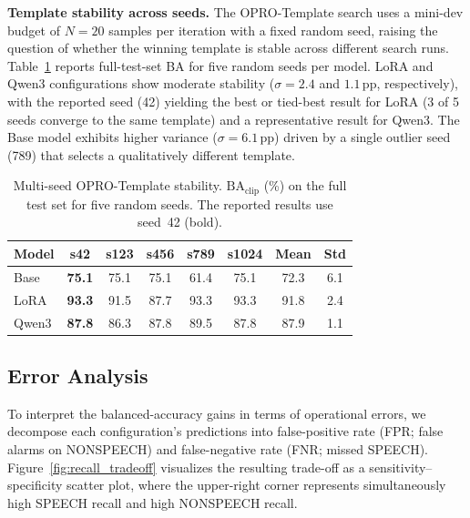 \documentclass[11pt,a4paper]{article}
\begin{document}
\textbf{Template stability across seeds.}
The OPRO-Template search uses a mini-dev budget of $N = 20$ samples per iteration with a fixed random seed, raising the question of whether the winning template is stable across different search runs. Table~\ref{tab:multiseed_opro} reports full-test-set BA for five random seeds per model. LoRA and Qwen3 configurations show moderate stability ($\sigma = 2.4$ and $1.1$\,pp, respectively), with the reported seed (42) yielding the best or tied-best result for LoRA (3 of 5 seeds converge to the same template) and a representative result for Qwen3. The Base model exhibits higher variance ($\sigma = 6.1$\,pp) driven by a single outlier seed (789) that selects a qualitatively different template.

\begin{table}[t]
\centering
\caption{Multi-seed OPRO-Template stability. $\text{BA}_{\text{clip}}$ (\%) on the full test set for five random seeds. The reported results use seed~42 (bold).}
\label{tab:multiseed_opro}
\footnotesize
\setlength{\tabcolsep}{4pt}
\renewcommand{\arraystretch}{1.12}
\begin{tabular}{lccccc|cc}
\toprule
\textbf{Model} & \textbf{s42} & \textbf{s123} & \textbf{s456} & \textbf{s789} & \textbf{s1024} & \textbf{Mean} & \textbf{Std} \\
\midrule
Base   & \textbf{75.1} & 75.1 & 75.1 & 61.4 & 75.1 & 72.3 & 6.1 \\
LoRA   & \textbf{93.3} & 91.5 & 87.7 & 93.3 & 93.3 & 91.8 & 2.4 \\
Qwen3  & \textbf{87.8} & 86.3 & 87.8 & 89.5 & 87.8 & 87.9 & 1.1 \\
\bottomrule
\end{tabular}
\end{table}


\subsection{Error Analysis}
\label{subsec:results_error_analysis}

To interpret the balanced-accuracy gains in terms of operational errors, we decompose each configuration's predictions into false-positive rate (FPR; false alarms on NONSPEECH) and false-negative rate (FNR; missed SPEECH). Figure~\ref{fig:recall_tradeoff} visualizes the resulting trade-off as a sensitivity--specificity scatter plot, where the upper-right corner represents simultaneously high SPEECH recall and high NONSPEECH recall.


\end{document}
